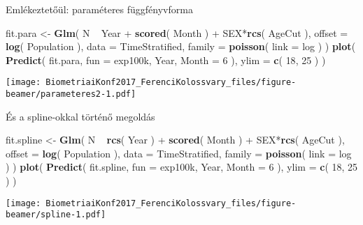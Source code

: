 \documentclass[ignorenonframetext,]{beamer}
\newenvironment{Shaded}{\begin{snugshade}}{\end{snugshade}}
\newcommand{\KeywordTok}[1]{\textcolor[rgb]{0.13,0.29,0.53}{\textbf{{#1}}}}
\newcommand{\DataTypeTok}[1]{\textcolor[rgb]{0.13,0.29,0.53}{{#1}}}
\newcommand{\DecValTok}[1]{\textcolor[rgb]{0.00,0.00,0.81}{{#1}}}
\newcommand{\StringTok}[1]{\textcolor[rgb]{0.31,0.60,0.02}{{#1}}}
\newcommand{\NormalTok}[1]{{#1}}
\begin{document}
\begin{frame}[fragile]{Emlékeztetőül: paraméteres függfényvforma}

\begin{Shaded}
\begin{Highlighting}[]
\NormalTok{fit.para <-}\StringTok{ }\KeywordTok{Glm}\NormalTok{( N ~}\StringTok{ }\NormalTok{Year +}\StringTok{ }\KeywordTok{scored}\NormalTok{( Month ) +}\StringTok{ }\NormalTok{SEX*}\KeywordTok{rcs}\NormalTok{( AgeCut ),}
                 \DataTypeTok{offset =} \KeywordTok{log}\NormalTok{( Population ), }\DataTypeTok{data =} \NormalTok{TimeStratified,}
                 \DataTypeTok{family =} \KeywordTok{poisson}\NormalTok{( }\DataTypeTok{link =} \NormalTok{log ) )}
\KeywordTok{plot}\NormalTok{( }\KeywordTok{Predict}\NormalTok{( fit.para, }\DataTypeTok{fun =} \NormalTok{exp100k, Year, }\DataTypeTok{Month =} \DecValTok{6} \NormalTok{), }\DataTypeTok{ylim =} \KeywordTok{c}\NormalTok{( }\DecValTok{18}\NormalTok{, }\DecValTok{25} \NormalTok{) )}
\end{Highlighting}
\end{Shaded}

\texttt{[image: BiometriaiKonf2017\_FerenciKolossvary\_files/figure-beamer/parameteres2-1.pdf]}

\end{frame}

\begin{frame}[fragile]{És a spline-okkal történő megoldás}

\begin{Shaded}
\begin{Highlighting}[]
\NormalTok{fit.spline <-}\StringTok{ }\KeywordTok{Glm}\NormalTok{( N ~}\StringTok{ }\KeywordTok{rcs}\NormalTok{( Year ) +}\StringTok{ }\KeywordTok{scored}\NormalTok{( Month ) +}\StringTok{ }\NormalTok{SEX*}\KeywordTok{rcs}\NormalTok{( AgeCut ),}
                   \DataTypeTok{offset =} \KeywordTok{log}\NormalTok{( Population ), }\DataTypeTok{data =} \NormalTok{TimeStratified,}
                   \DataTypeTok{family =} \KeywordTok{poisson}\NormalTok{( }\DataTypeTok{link =} \NormalTok{log ) )}
\KeywordTok{plot}\NormalTok{( }\KeywordTok{Predict}\NormalTok{( fit.spline, }\DataTypeTok{fun =} \NormalTok{exp100k, Year, }\DataTypeTok{Month =} \DecValTok{6} \NormalTok{), }\DataTypeTok{ylim =} \KeywordTok{c}\NormalTok{( }\DecValTok{18}\NormalTok{, }\DecValTok{25} \NormalTok{) )}
\end{Highlighting}
\end{Shaded}

\texttt{[image: BiometriaiKonf2017\_FerenciKolossvary\_files/figure-beamer/spline-1.pdf]}

\end{frame}
\end{document}
